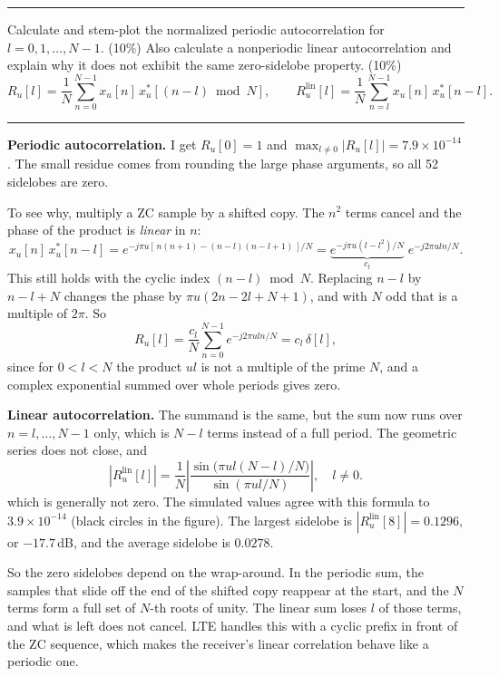 \documentclass[12pt,a4paper]{report}
\newcommand{\question}[1]{%
    \hrule
    \vspace{0.2cm}
    #1
    \vspace{0.2cm}
    \hrule
    \vspace{0.5cm}
}
\begin{document}
\question{Calculate and stem-plot the normalized periodic autocorrelation for $l = 0, 1, \ldots, N-1$. (10\%)
Also calculate a nonperiodic linear autocorrelation and explain why it does not exhibit the same zero-sidelobe
property. (10\%)
\[ R_u[l] = \frac{1}{N}\sum_{n=0}^{N-1} x_u[n]\,x_u^*[(n-l) \bmod N], \qquad
   R_u^{\text{lin}}[l] = \frac{1}{N}\sum_{n=l}^{N-1} x_u[n]\,x_u^*[n-l]. \]}

\textbf{Periodic autocorrelation.} I get $R_u[0] = 1$ and $\max_{l \neq 0}|R_u[l]| = 7.9 \times 10^{-14}$.
The small residue comes from rounding the large phase arguments, so all 52 sidelobes are zero.

To see why, multiply a ZC sample by a shifted copy. The $n^2$ terms cancel and the phase of the product is
\emph{linear} in $n$:
\begin{equation}
    x_u[n]\,x_u^*[n-l]
    = e^{-j\pi u [\,n(n+1) - (n-l)(n-l+1)\,]/N}
    = \underbrace{e^{-j\pi u(l - l^2)/N}}_{c_l}\; e^{-j2\pi u l n/N}.
\end{equation}
This still holds with the cyclic index $(n-l) \bmod N$. Replacing $n-l$ by $n-l+N$ changes the phase by
$\pi u (2n - 2l + N + 1)$, and with $N$ odd that is a multiple of $2\pi$. So
\begin{equation}
    R_u[l] = \frac{c_l}{N}\sum_{n=0}^{N-1} e^{-j2\pi u l n/N} = c_l\,\delta[l],
\end{equation}
since for $0 < l < N$ the product $ul$ is not a multiple of the prime $N$, and a complex exponential summed over whole
periods gives zero.

\textbf{Linear autocorrelation.} The summand is the same, but the sum now runs over $n = l, \ldots, N-1$ only, which is
$N - l$ terms instead of a full period. The geometric series does not close, and
\begin{equation}
    |R_u^{\text{lin}}[l]| = \frac{1}{N}\left|\frac{\sin\big(\pi u l (N-l)/N\big)}{\sin(\pi u l/N)}\right|, \quad l \neq 0 .
\end{equation}
which is generally not zero. The simulated values agree with this formula to $3.9 \times 10^{-14}$ (black circles in the
figure). The largest sidelobe is $|R_u^{\text{lin}}[8]| = 0.1296$, or $-17.7$\,dB, and the average sidelobe is $0.0278$.

So the zero sidelobes depend on the wrap-around. In the periodic sum, the samples that slide off the end of the shifted
copy reappear at the start, and the $N$ terms form a full set of $N$-th roots of unity. The linear sum loses $l$ of those
terms, and what is left does not cancel. LTE handles this with a cyclic prefix in front of the ZC sequence, which makes
the receiver's linear correlation behave like a periodic one.
\end{document}
